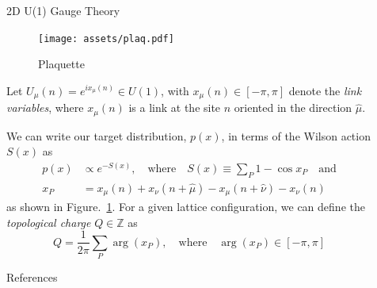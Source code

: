 \documentclass[final]{beamer}
\newlength{\sepwidth}
\newlength{\colwidth}
\newcommand{\separatorcolumn}{\begin{column}{\sepwidth}\end{column}}
\begin{document}
\begin{frame}[t]
\begin{columns}[t]
\separatorcolumn

\begin{column}{\colwidth}
  \begin{block}{2D U(1) Gauge Theory}
    \begin{figure}
      \texttt{[image: assets/plaq.pdf]}
      \caption{\label{fig:plaquette}Plaquette}%
    \end{figure}
    Let \(U_{\mu}(n) = e^{i x_{\mu}(n)} \in U(1)\), with \(x_{\mu}(n) \in \left[-\pi, \pi\right]\) denote the \emph{link
    variables}, where \(x_{\mu}(n)\) is a link at the site \(n\) oriented in the direction \(\hat\mu\).

    We can write our target distribution, \(p(x)\), in terms of the Wilson action \(S(x)\) as
    \begin{align}
      p(x)&\propto e^{- S(x)}, \quad \text{where}\quad S(x) \equiv \sum_{P} 1 - \cos x_{P}\quad\text{and}\\
      x_{P} &= x_{\mu}(n) + x_{\nu}(n+\hat{\mu})-x_{\mu}(n+\hat{\nu}) - x_{\nu}(n)
    \end{align}
    as shown in Figure.~\ref{fig:plaquette}.
    For a given lattice configuration, we can define the \emph{topological charge} \(Q \in \mathbb{Z}\) as
    \begin{equation}
      Q = \frac{1}{2\pi}\sum_{P} \arg(x_{P}), \quad\text{where}\quad \arg(x_{P}) \in [-\pi,\pi]
    \end{equation}
  \end{block}

  \begin{block}{References}
    \nocite{*}
    \footnotesize{}
  \end{block}
\end{column}
\separatorcolumn
\end{columns}
\end{frame}
\end{document}
